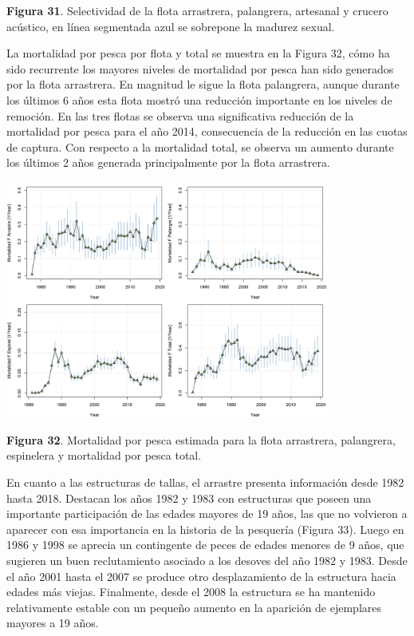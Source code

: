 \documentclass[
  spanish,
]{article}
\begin{document}
\small \textbf{Figura 31}. Selectividad de la flota arrastrera,
palangrera, artesanal y crucero acústico, en línea segmentada azul se
sobrepone la madurez sexual. \vspace{0.5cm} \normalsize

La mortalidad por pesca por flota y total se muestra en la Figura 32,
cómo ha sido recurrente los mayores niveles de mortalidad por pesca han
sido generados por la flota arrastrera. En magnitud le sigue la flota
palangrera, aunque durante los últimos 6 años esta flota mostró una
reducción importante en los niveles de remoción. En las tres flotas se
observa una significativa reducción de la mortalidad por pesca para el
año 2014, consecuencia de la reducción en las cuotas de captura. Con
respecto a la mortalidad total, se observa un aumento durante los
últimos 2 años generada principalmente por la flota arrastrera.

\begin{center}
\includegraphics[width=0.8\textwidth]{Figuras/mortalidad.png}
\end{center}

\small \textbf{Figura 32}. Mortalidad por pesca estimada para la flota
arrastrera, palangrera, espinelera y mortalidad por pesca total.
\vspace{0.5cm} \normalsize

En cuanto a las estructuras de tallas, el arrastre presenta información
desde 1982 hasta 2018. Destacan los años 1982 y 1983 con estructuras que
poseen una importante participación de las edades mayores de 19 años,
las que no volvieron a aparecer con esa importancia en la historia de la
pesquería (Figura 33). Luego en 1986 y 1998 se aprecia un contingente de
peces de edades menores de 9 años, que sugieren un buen reclutamiento
asociado a los desoves del año 1982 y 1983. Desde el año 2001 hasta el
2007 se produce otro desplazamiento de la estructura hacia edades más
viejas. Finalmente, desde el 2008 la estructura se ha mantenido
relativamente estable con un pequeño aumento en la aparición de
ejemplares mayores a 19 años.
\end{document}
